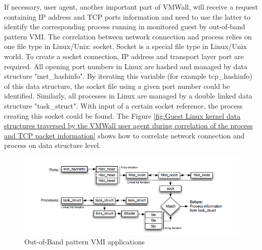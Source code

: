 If necessary, user agent, another important part of VMWall, will receive a request containing IP address and TCP ports
information and need to use the latter to identify the corresponding process running in monitored guest by out-of-band
pattern VMI. The correlation between network connection and process relies on one file type in Linux/Unix: socket.
Socket is a special file type in Linux/Unix world. To create a socket connection, IP address and transport layer port are
required. All opening port numbers in Linux are hashed and managed by data structure "inet\_hashinfo". By iterating this
variable (for example tcp\_hashinfo) of this data structure, the socket file using a given port number could be identified. 
Similarly, all processes in Linux are managed by a double linked data structure "task\_struct". With input of a certain socket
reference, the process creating this socket could be found. The Figure \ref{fig:Guest Linux kernel data structures traversed by
the VMWall user agent during correlation of the process and TCP packet information} shows how to correlate network
connection and process on data structure level.

\begin{figure}[htbp]
	\centering
		\includegraphics[scale = 0.8 ]{Figures/Figure4.png}
	\caption[Out-of-Band pattern VMI applications]{Out-of-Band pattern VMI applications}
	\label{fig:Guest Linux kernel data structures traversed by the VMWall user agent during correlation of the
process and TCP packet information}
\end{figure}

